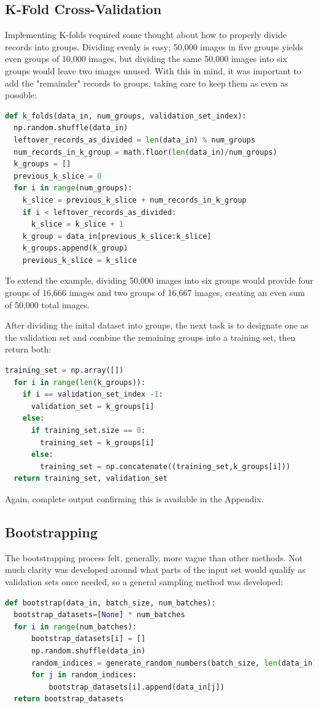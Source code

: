 \documentclass{article}
\begin{document}
\subsection{K-Fold Cross-Validation}
Implementing K-folds required some thought about how to properly divide records into groups.
Dividing evenly is easy; 50,000 images in five groups yields even groups of 10,000 images, but dividing the same 50,000 images into six groups would leave two images unused.
With this in mind, it was important to add the "remainder" records to groups, taking care to keep them as even as possible:
\begin{lstlisting}[language=Python]
def k_folds(data_in, num_groups, validation_set_index):
  np.random.shuffle(data_in)
  leftover_records_as_divided = len(data_in) % num_groups
  num_records_in_k_group = math.floor(len(data_in)/num_groups)
  k_groups = []
  previous_k_slice = 0
  for i in range(num_groups):
    k_slice = previous_k_slice + num_records_in_k_group
    if i < leftover_records_as_divided:
      k_slice = k_slice + 1
    k_group = data_in[previous_k_slice:k_slice]
    k_groups.append(k_group)
    previous_k_slice = k_slice
\end{lstlisting}

To extend the example, dividing 50,000 images into six groups would provide four groups of 16,666 images and two groups of 16,667 images, creating an even sum of 50,000 total images.

After dividing the inital dataset into groups, the next task is to designate one as the validation set and combine the remaining groups into a training set, then return both:
\begin{lstlisting}[language=Python]
  training_set = np.array([])
  for i in range(len(k_groups)):
    if i == validation_set_index -1:
      validation_set = k_groups[i]
    else:
      if training_set.size == 0:
        training_set = k_groups[i]
      else:
        training_set = np.concatenate((training_set,k_groups[i]))
  return training_set, validation_set
\end{lstlisting}
Again, complete output confirming this is available in the  Appendix.

\subsection{Bootstrapping}
The bootstrapping process felt, generally, more vague than other methods.
Not much clarity was developed around what parts of the input set would qualify as validation sets once needed, so a general sampling method was developed:
\begin{lstlisting}[language=Python]
def bootstrap(data_in, batch_size, num_batches):
  bootstrap_datasets=[None] * num_batches
  for i in range(num_batches):
      bootstrap_datasets[i] = []
      np.random.shuffle(data_in)
      random_indices = generate_random_numbers(batch_size, len(data_in))
      for j in random_indices:
          bootstrap_datasets[i].append(data_in[j])
  return bootstrap_datasets
\end{lstlisting}
\end{document}
